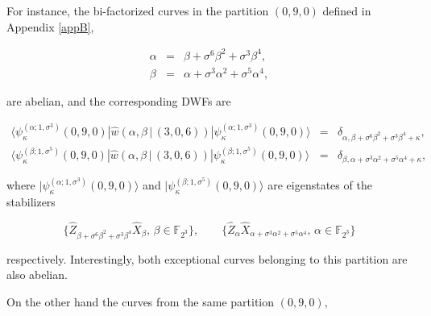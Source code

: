 \documentclass[quantumrep,article,submit,pdftex,moreauthors]{Definitions/mdpi}
\begin{document}
For instance, the bi-factorized curves in the partition $(0,9,0)$ defined in
Appendix \ref{appB},

\begin{eqnarray}
  \alpha
  &=& \beta + \sigma^{6} \beta^{2} + \sigma^{3}\beta^{4},
  \label{ac1} \\
  \beta
  &=& \alpha + \sigma^{3} \alpha^{2} + \sigma^{5}\alpha^{4},
  \label{ac2}
\end{eqnarray}

are abelian, and the corresponding DWFs are

\begin{eqnarray}
  \langle \psi_{\kappa}^{(\alpha ; 1,\sigma^{3})}(0,9,0)
  |\hat{w}\left(\alpha,\beta \, | \, (3,0,6)\right)
  |\psi_{\kappa}^{(\alpha ; 1,\sigma^{3})}(0,9,0)\rangle
  &=& \delta_{\alpha, \beta + \sigma^{6}\beta^{2} + \sigma^{3} \beta^{4} + \kappa}, \\
  \langle \psi_{\kappa }^{(\beta ; 1,\sigma^{5})}(0,9,0)
  |\hat{w}\left(\alpha,\beta \, | \, (3,0,6)\right)
  |\psi_{\kappa}^{(\beta ; 1,\sigma^{5})}(0,9,0)\rangle
  &=& \delta_{\beta,\alpha + \sigma^{3}\alpha^{2} + \sigma^{5} \alpha^{4} + \kappa},
  \label{ac2 delta}
\end{eqnarray}

where $|\psi_{\kappa}^{(\alpha ; 1,\sigma^{3})}(0,9,0)\rangle$ and
$|\psi_{\kappa }^{(\beta ; 1,\sigma^{5})}(0,9,0)\rangle$ are eigenstates of the
stabilizers

\begin{equation*}
  \{\hat{Z}_{\beta + \sigma^{6}\beta ^{2}+\sigma^{3}\beta^{4}} \hat{X}_{\beta},
  \, \beta \in \mathbb{F}_{2^{3}}\},
  \qquad \{\hat{Z}_{\alpha } \hat{X}_{\alpha + \sigma^{3}\alpha^{2} + \sigma^{5}\alpha^{4}},
  \, \alpha \in \mathbb{F}_{2^{3}}\}
\end{equation*}

respectively. Interestingly, both exceptional curves belonging to this partition
are also abelian.

On the other hand the curves from the same partition $(0,9,0)$,
\end{document}
